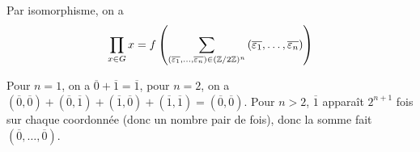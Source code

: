 \begin{remark}
	Par isomorphisme, on a 
	\begin{equation}
		\prod_{x\in G}x=f\left(\sum_{(\overline{\varepsilon_{1}},\dots,\overline{\varepsilon_{n}})\in(\mathbb{Z}/2\mathbb{Z})^{n}}\left(\overline{\varepsilon_{1}},\dots,\overline{\varepsilon_{n}}\right)\right)
	\end{equation}

	Pour $n=1$, on a $\overline{0}+\overline{1}=\overline{1}$, pour $n=2$, on a $(\overline{0},\overline{0})+(\overline{0},\overline{1})+(\overline{1},\overline{0})+(\overline{1},\overline{1})=(\overline{0},\overline{0})$. Pour $n>2$, $\overline{1}$ apparaît $2^{n+1}$ fois sur chaque coordonnée (donc un nombre pair de fois), donc la somme fait $(\overline{0},\dots,\overline{0})$.
\end{remark}

